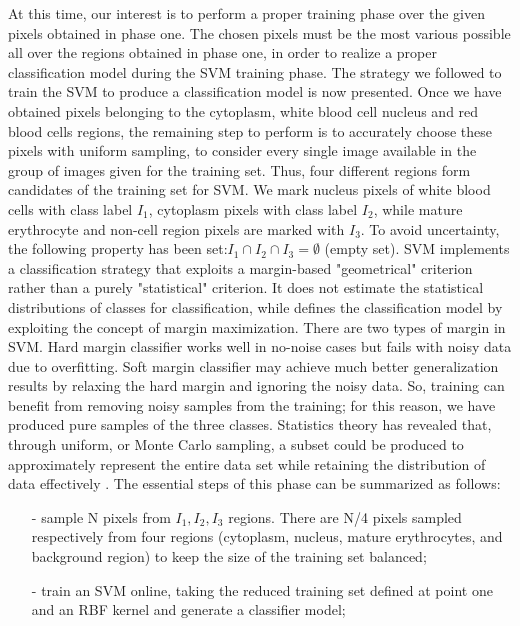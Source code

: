 {	%
	At this time, our interest is to perform a proper training phase over the given pixels obtained in phase one. The chosen pixels must be the most various possible all over the regions obtained in phase one, in order to realize a proper classification model during the SVM training phase. 
	The strategy we followed to train the SVM to produce a classification model is now presented. Once we have obtained pixels belonging to the cytoplasm, white blood cell nucleus and red blood cells regions, the remaining step to perform is to accurately choose these pixels with uniform sampling, to consider every single image available in the group of images given for the training set.
	Thus, four different regions form candidates of the training set for SVM. We mark nucleus pixels of white blood cells with class label $I_1$, cytoplasm pixels with class label $I_2$, while mature erythrocyte and non-cell region pixels are marked with $I_3$. To avoid uncertainty, the following property has been set:$ I_1\cap I_2 \cap I_3 = \emptyset$ (empty set). SVM implements a classification strategy that exploits a margin-based "geometrical" criterion rather than a purely "statistical" criterion. It does not estimate the statistical distributions of classes for classification, while defines the classification model by exploiting the concept of margin maximization. There are two types of margin in SVM. Hard margin classifier works well in no-noise cases but fails with noisy data due to overfitting. Soft margin classifier may achieve much better generalization results by relaxing the hard margin and ignoring the noisy data. So, training can benefit from removing noisy samples from the training; for this reason, we have produced pure samples of the three classes. Statistics theory has revealed that, through uniform, or Monte Carlo sampling, a subset could be produced to approximately represent the entire data set while retaining the distribution of data effectively \cite{caflisch}.
	The essential steps of this phase can be summarized as follows:
	\begin{itemize}\itemsep3pt \parskip0pt 
		\item[-] sample N pixels from $ I_1, I_2, I_3$ regions. There are N/4 pixels sampled respectively from four regions (cytoplasm, nucleus, mature erythrocytes, and background region) to keep the size of the training set balanced;
		\item[-] train an SVM online, taking the reduced training set defined at point one and an RBF kernel and generate a classifier model;

\end{itemize}}
